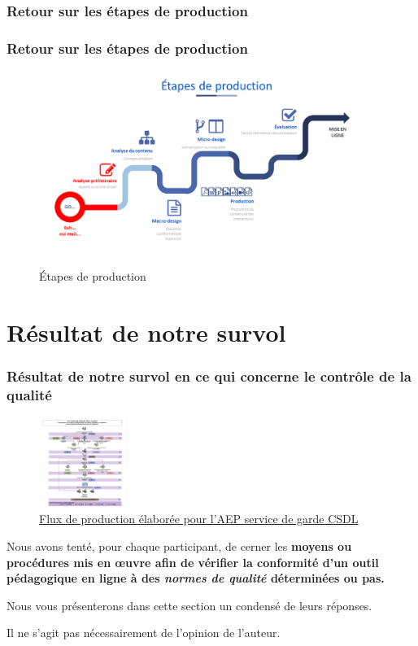 	\subsubsection{Retour sur les étapes de production} 
\begin{frame}
\frametitle{Retour sur les étapes de production}
\begin{figure}
\includegraphics[scale=0.20]{flux1.png}
\caption{Étapes de production}
\end{figure}
\end{frame}
	\section{Résultat de notre survol} 
						\begin{frame}[allowframebreaks]
						\frametitle{Résultat de notre survol en ce qui concerne le contrôle de la qualité \citep{prudhomme2015a}}
                        			\begin{figure}
                     			\centering
                    			 \includegraphics[width = 0.25\textwidth]{flux.png}
                     			\caption{\tiny{\href{run:flux.png}{Flux de production élaborée pour l'AEP service de garde CSDL}}}
                   			\end{figure}
                        			Nous avons tenté, pour chaque participant, de cerner les \textbf{moyens ou procédures mis en œuvre afin de vérifier la conformité d’un outil pédagogique en ligne à des \textit{normes de qualité} déterminées ou pas.} 
                        			\par Nous vous présenterons dans cette section un condensé de leurs réponses. 
                        			\par Il ne s'agit pas nécessairement de l'opinion de l'auteur.
						
						\end{frame}
						
